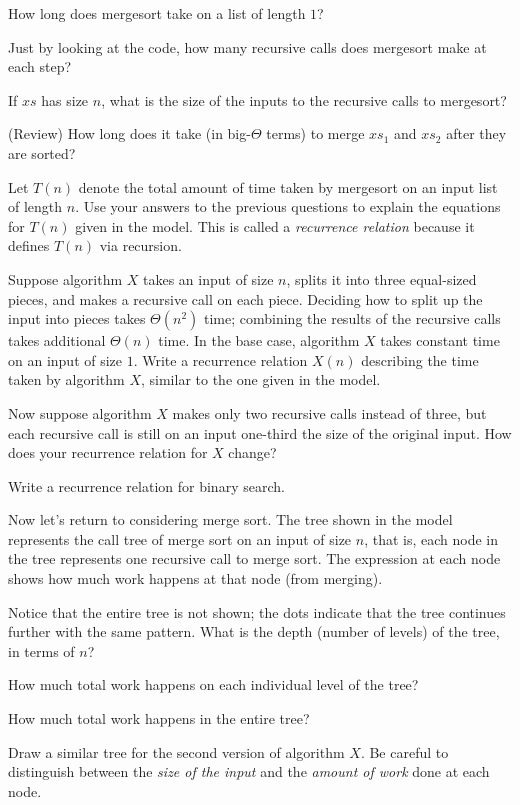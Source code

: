 \documentclass{tufte-handout}
\begin{document}
\begin{questions}
  \item How long does \textsf{mergesort} take on a list of length $1$?
  \item Just by looking at the code, how many recursive calls does
  \textsf{mergesort} make at each step?
  \item If $xs$ has size $n$, what is the size of the inputs to the
    recursive calls to \textsf{mergesort}?
  \item (Review) How long does it take (in big-$\Theta$ terms) to
    merge $xs_1$ and $xs_2$ after they are sorted?
  \item Let $T(n)$ denote the total amount of time taken by
    \textsf{mergesort} on an input list of length $n$.  Use your
    answers to the previous questions to explain the equations for
    $T(n)$ given in the model.  This is called a \emph{recurrence
      relation} because it defines $T(n)$ via recursion.
  \item Suppose algorithm $X$ takes an input of size $n$, splits it
    into three equal-sized pieces, and makes a recursive call on each
    piece.  Deciding how to split up the input into pieces takes
    $\Theta(n^2)$ time; combining the results of the recursive calls
    takes additional $\Theta(n)$ time.  In the base case, algorithm
    $X$ takes constant time on an input of size $1$. Write a
    recurrence relation $X(n)$ describing the time taken by algorithm
    $X$, similar to the one given in the model.
  \item Now suppose algorithm $X$ makes only two recursive calls instead
    of three, but each recursive call is still on an input one-third
    the size of the original input.  How does your recurrence relation
    for $X$ change?
  \item Write a recurrence relation for binary search.
\end{questions}

Now let's return to considering merge sort.  The tree shown in
the model represents the call tree of merge sort on an input of
size $n$, that is, each node in the tree represents one recursive call
to merge sort.  The expression at each node shows how much work
happens at that node (from merging).

\begin{questions}
  \item Notice that the entire tree is not shown; the dots indicate
    that the tree continues further with the same pattern.  What is
    the depth (number of levels) of the tree, in terms of $n$?
  \item How much total work happens on each individual level of the tree?
  \item How much total work happens in the entire tree?
  \item Draw a similar tree for the second version of algorithm
    $X$. Be careful to distinguish between the \emph{size of the
      input} and the \emph{amount of work} done at each node.
\end{questions}
\end{document}
